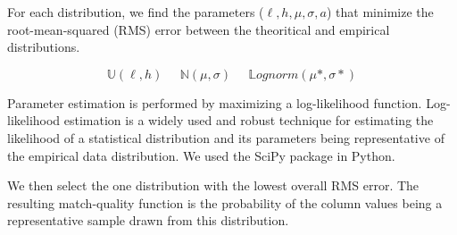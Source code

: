 For each distribution, we find the parameters ($\ell,h,\mu,\sigma,a$) that minimize the root-mean-squared (RMS) error between the theoritical and empirical distributions. 

$$\mathbb U(\ell, h)\;\;\;\;\;\mathbb N(\mu, \sigma)\;\;\;\;\;\mathbb Lognorm(\mu{*},\sigma{*})$$

Parameter estimation is performed by maximizing a log-likelihood function. Log-likelihood estimation is a widely used and robust technique for estimating the likelihood of a statistical distribution and its parameters being representative of the empirical data distribution. We used the SciPy package in Python. 

We then select the one distribution with the lowest overall RMS error. The resulting match-quality function is the probability of the column values being a representative sample drawn from this distribution.
